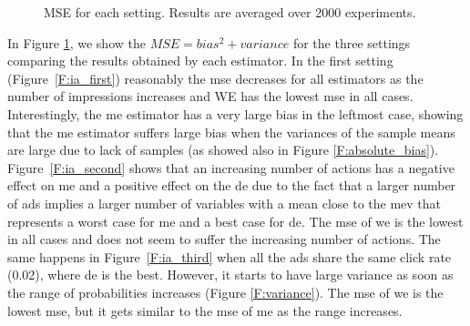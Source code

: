 \begin{figure}[t]
\begin{minipage}{\textwidth}
    \caption{MSE for each setting. Results are averaged over 2000 experiments.}\label{F:iAds}
    \end{minipage}
\end{figure}

In Figure \ref{F:iAds}, we show the $MSE = bias^2 + variance$ for the three settings comparing the results obtained by each estimator. 
In the first setting (Figure~\ref{F:ia_first}) reasonably the \gls{mse} decreases for all estimators as the number of impressions increases and WE has the lowest \gls{mse} in all cases. Interestingly, the \gls{me} estimator has a very large bias in the leftmost case, showing that the \gls{me} estimator suffers large bias when the variances of the sample means are large due to lack of samples (as showed also in Figure \ref{F:absolute_bias}).
Figure~\ref{F:ia_second} shows that an increasing number of actions has a negative effect on \gls{me} and a positive effect on the \gls{de} due to the fact that a larger number of ads implies a larger number of variables with a mean close to the \gls{mev} that represents a worst case for \gls{me} and a best case for \gls{de}. 
The \gls{mse} of \gls{we} is the lowest in all cases and does not seem to suffer the increasing number of actions. 
The same happens in Figure~\ref{F:ia_third} when all the ads share the same click rate (0.02), where \gls{de} is the best.
However, it starts to have large variance as soon as the range of probabilities increases (Figure \ref{F:variance}). 
The \gls{mse} of \gls{we} is the lowest \gls{mse}, but it gets similar to the \gls{mse} of \gls{me} as the range increases.

